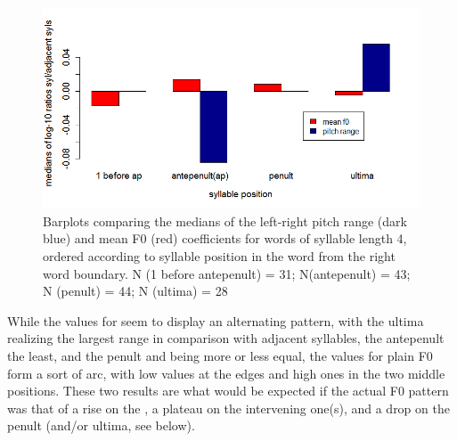 \documentclass[output=paper]{LSP/langsci}
\begin{document}
\begin{figure}
\includegraphics[width=\textwidth]{figures/BUC-img4_new.png}
\caption{
Barplots comparing the medians of the left-right  {pitch range} (dark blue) and mean F0 (red) coefficients for words of  {syllable} length 4, ordered according to  {syllable position} in the word from the  {right word boundary}. N (1 before antepenult) = 31; N(antepenult) = 43; N (penult) = 44; N (ultima) = 28
}
\label{fig:buc:4}
\end{figure}



While the values for  seem to display an alternating pattern, with the ultima realizing the largest range in comparison with adjacent syllables, the antepenult the least, and the penult and  being more or less equal, the values for plain F0 form a sort of arc, with low values at the edges and high ones in the two middle positions. These two results are what would be expected if the actual F0 pattern was that of a rise on the , a plateau on the intervening one(s), and a drop on the penult (and/or ultima, see below).

\end{document}
